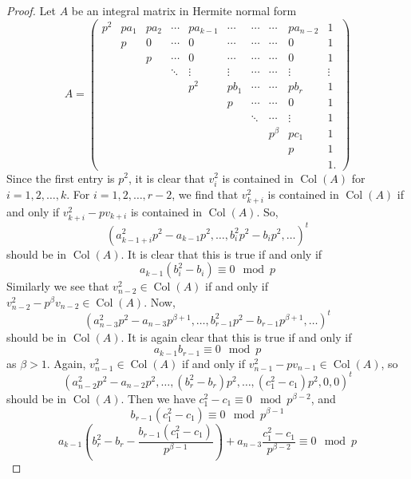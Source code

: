 \documentclass[a4paper]{amsart}
\numberwithin{equation}{section}
\theoremstyle{remark}
\newcommand{\op}[1]{\operatorname{#1}}
\begin{document}
\begin{proof}
 Let $A$ be an integral matrix in Hermite normal form \[A=\begin{pmatrix}
	 p^{2}& p a_1 & pa_2 & \cdots & pa_{k-1}& \cdots & \cdots &\cdots& p a_{n-2} & 1 \\
	& p & 0 & \cdots & 0 &  \cdots & \cdots &\cdots& 0 & 1\\
	&& p & \cdots & 0 & \cdots &  \cdots &\cdots& 0  & 1\\
	&&& \ddots & \vdots& \vdots & \cdots &\cdots& \vdots & \vdots\\
	&&&& p^{2} & p b_1 & \cdots &\cdots& p b_r & 1\\
    &&&&  & p & \cdots &\cdots& 0 & 1\\
    	&&&&& & \ddots &\cdots& \vdots & 1\\
	&&&&&&& p^{\beta} & p c_1 & 1\\
	&&&&&&&&p&1\\
	&&&&&&&&&1.
	\end{pmatrix}\]
Since the first entry is $p^2$, it is clear that $v_i^2$ is contained in $\op{Col}(A)$ for $i=1,2,\dots,k$. For $i = 1,2,\dots,r-2$, we find that $v_{k+i}^2$ is contained in $\op{Col}(A)$ if and only if $v_{k+i}^2-pv_{k+i}$ is contained in $\op{Col}(A)$. So,
\[(a_{k-1+i}^2p^2-a_{k-1}p^2,\dots,b_i^2p^2-b_ip^2,\dots)^t\]
should be in $\op{Col}(A)$. It is clear that this is true if and only if
\begin{equation}
    a_{k-1}(b_i^2-b_i) \equiv 0 \mod{p}
\end{equation}
Similarly we see that $v_{n-2}^2 \in \op{Col}(A)$ if and only if $v_{n-2}^2 - p^{\beta}v_{n-2} \in \op{Col}(A)$. Now,
\[(a_{n-3}^2p^2-a_{n-3}p^{\beta+1},\dots,b_{r-1}^2p^2-b_{r-1}p^{\beta+1},\dots)^t\]
should be in $\op{Col}(A)$. It is again clear that this is true if and only if
\begin{equation}
    a_{k-1}b_{r-1} \equiv 0 \mod p
\end{equation}
as $\beta > 1$. Again, $v_{n-1}^2 \in \op{Col}(A)$ if and only if $v_{n-1}^2 - pv_{n-1} \in \op{Col}(A)$, so
\[(a_{n-2}^2p^2-a_{n-2}p^2,\dots,(b_r^2-b_r)p^2,\dots,(c_1^2-c_1)p^2, 0, 0)^t\]
should be in $\op{Col}(A)$. Then we have $c_1^2-c_1 \equiv 0 \mod p^{\beta-2}$, and
\begin{equation}
 b_{r-1}(c_1^2-c_1) \equiv 0 \mod p^{\beta-1}
 \end{equation}
 \begin{equation}
 a_{k-1}\left(b_r^2-b_r-\frac{b_{r-1}(c_1^2-c_1)}{p^{\beta-1}}\right)+a_{n-3}\frac{c_1^2-c_1}{p^{\beta-2}} \equiv 0 \mod p

\end{equation}
\end{proof}
\end{document}
